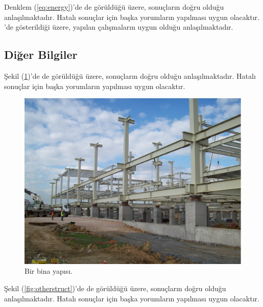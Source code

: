 \documentclass[turkish]{eqconf}
\begin{document}
Denklem (\ref{eq:energy})'de de görüldüğü üzere, sonuçların doğru olduğu anlaşılmaktadır. Hatalı sonuçlar için başka yorumların yapılması uygun olacaktır. \textcite{Narasimhan2006,Erkus2006}'de gösterildiği üzere, yapılan çalışmaların uygun olduğu anlaşılmaktadır.

\blindtext

\subsection{Diğer Bilgiler}
\blindtext

Şekil (\ref{fig:structure})'de de görüldüğü üzere, sonuçların doğru olduğu anlaşılmaktadır. Hatalı sonuçlar için başka yorumların yapılması uygun olacaktır.

\blindtext

\begin{figure}
	\vspace{-12pt}
	\centering
	\includegraphics[scale=0.2]{b.PNG}
	\caption{\label{fig:structure}Bir bina yapısı.}
	\vspace{-10pt}
\end{figure}

\blindtext

Şekil (\ref{fig:otherstruct})'de de görüldüğü üzere, sonuçların doğru olduğu anlaşılmaktadır. Hatalı sonuçlar için başka yorumların yapılması uygun olacaktır.
\end{document}
